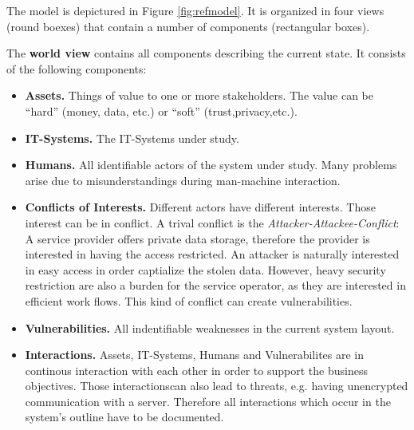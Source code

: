 

The model is depictured in Figure \ref{fig:refmodel}.
It is organized in four views (round boexes) that contain a number of components (rectangular boxes).

The \textbf{world view} contains all components describing the current state.
It consists of the following components:
\begin{itemize}
\item
\textbf{Assets.}
Things of value to one or more stakeholders.
The value can be ``hard'' (money, data, etc.) or ``soft'' (trust,privacy,etc.).

\item \textbf{IT-Systems.}
The IT-Systems under study.

\item \textbf{Humans.}
All identifiable actors of the system under study.
Many problems arise due to misunderstandings during man-machine interaction.

\item \textbf{Conflicts of Interests.}
Different actors have different interests.
Those interest can be in conflict.
A trival conflict is the \emph{Attacker-Attackee-Conflict}:
A service provider offers private data storage, therefore the provider is interested in having the access restricted.
An attacker is naturally interested in easy access in order captialize the stolen data.
However, heavy security restriction are also a burden for the service operator, as they are interested in efficient work flows.
This kind of conflict can create vulnerabilities.

\item \textbf{Vulnerabilities.}
All indentifiable weaknesses in the current system layout.

\item \textbf{Interactions.}
Assets, IT-Systems, Humans and Vulnerabilites are in continous interaction with each other in order to support the business objectives.
Those interactionscan also lead to threats, e.g. having unencrypted communication with a server.
Therefore all interactions which occur in the system's outline have to be documented.
\end{itemize}

